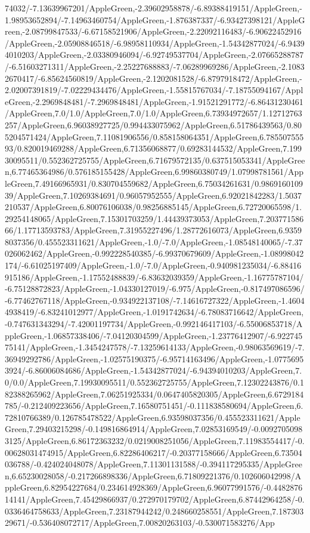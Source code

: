 {\begin{tikzternal}
74032/-7.13639967201/AppleGreen,-2.39602958878/-6.89388419151/AppleGreen,-1.98953652894/-7.14963460754/AppleGreen,-1.876387337/-6.93427398121/AppleGreen,-2.08799847533/-6.67158521906/AppleGreen,-2.22092116483/-6.90622452916/AppleGreen,-2.05908846518/-6.98958110934/AppleGreen,-1.54342877024/-6.94394010203/AppleGreen,-2.03380946094/-6.92749537704/AppleGreen,-2.07665288787/-6.51603271311/AppleGreen,-2.25227688883/-7.06289969286/AppleGreen,-2.10832670417/-6.85624560819/AppleGreen,-2.1202081528/-6.8797918472/AppleGreen,-2.02007391819/-7.02229434476/AppleGreen,-1.55815767034/-7.18755094167/AppleGreen,-2.2969848481/-7.2969848481/AppleGreen,-1.91521291772/-6.86431230461/AppleGreen,7.0/1.0/AppleGreen,7.0/1.0/AppleGreen,6.73934972657/1.12712763257/AppleGreen,6.96038927725/0.994433075962/AppleGreen,6.51786439563/0.805204571424/AppleGreen,7.11081906556/0.858158064351/AppleGreen,6.78550755593/0.820019469288/AppleGreen,6.71356068877/0.69283144532/AppleGreen,7.19930095511/0.552362725755/AppleGreen,6.71679572135/0.637515053341/AppleGreen,6.77465364986/0.576185155428/AppleGreen,6.99860380749/1.07998781561/AppleGreen,7.49166965931/0.830704559682/AppleGreen,6.75034261631/0.986916010939/AppleGreen,7.10269384691/0.96057952555/AppleGreen,6.92021842283/1.5037210537/AppleGreen,6.80076106038/0.98256885145/AppleGreen,6.72720065598/1.29254148065/AppleGreen,7.15301703259/1.44439373053/AppleGreen,7.20377158666/1.17713593783/AppleGreen,7.31955227496/1.28772616073/AppleGreen,6.93598037356/0.455523311621/AppleGreen,-1.0/-7.0/AppleGreen,-1.08548140065/-7.37026062462/AppleGreen,-0.992228540385/-6.99370679609/AppleGreen,-1.08998042174/-6.61025197409/AppleGreen,-1.0/-7.0/AppleGreen,-0.940981235034/-6.88416915186/AppleGreen,-1.17552488839/-6.83632039359/AppleGreen,-1.16775787104/-6.75128872823/AppleGreen,-1.04330127019/-6.975/AppleGreen,-0.817497086596/-6.77462767118/AppleGreen,-0.934922137108/-7.14616727322/AppleGreen,-1.46044938419/-6.83241012977/AppleGreen,-1.0191742634/-6.78083716642/AppleGreen,-0.747631343294/-7.42001197734/AppleGreen,-0.992146417103/-6.55006853718/AppleGreen,-1.06857338406/-7.04120304599/AppleGreen,-1.23776412907/-6.92274575141/AppleGreen,-1.3454247578/-7.13259614133/AppleGreen,-0.98063569619/-7.36949292786/AppleGreen,-1.02575190375/-6.95714163496/AppleGreen,-1.07756953924/-6.86006084686/AppleGreen,-1.54342877024/-6.94394010203/AppleGreen,7.0/0.0/AppleGreen,7.19930095511/0.552362725755/AppleGreen,7.12302243876/0.182388265962/AppleGreen,7.06251925334/0.0647405820305/AppleGreen,6.6729184785/-0.212409223656/AppleGreen,7.16580751451/-0.111838580694/AppleGreen,6.72810766389/0.126785478522/AppleGreen,6.93598037356/0.455523311621/AppleGreen,7.29403215298/-0.149816864914/AppleGreen,7.02853169549/-0.00927050983125/AppleGreen,6.86172363232/0.0219008251056/AppleGreen,7.11983554417/-0.00628031474915/AppleGreen,6.82286406217/-0.20377158666/AppleGreen,6.73504036788/-0.424024048078/AppleGreen,7.11301131588/-0.394117295335/AppleGreen,6.65230028058/-0.217266898336/AppleGreen,6.71809221376/0.102606042998/AppleGreen,6.82954227684/0.234614928369/AppleGreen,6.96077991576/-0.448287614141/AppleGreen,7.45429866937/0.272970179702/AppleGreen,6.87442964258/-0.0336464758633/AppleGreen,7.23187944242/0.248660258551/AppleGreen,7.18730329671/-0.536408072717/AppleGreen,7.00820263103/-0.530071583276/App
\end{tikzternal}}
